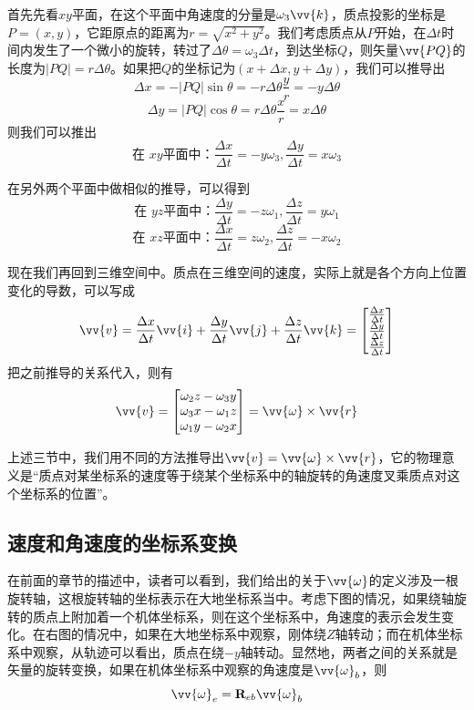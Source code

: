 \documentclass[11pt]{article}
\begin{document}
首先先看$xy$平面，在这个平面中角速度的分量是$\omega_3\vv{k}$，质点投影的坐标是$P=(x,y)$，它距原点的距离为$r = \sqrt{x^2+y^2}$。我们考虑质点从$P$开始，在$\Delta t$时间内发生了一个微小的旋转，转过了$\Delta\theta = \omega_3\Delta t$，到达坐标$Q$，则矢量$\vv{PQ}$的长度为$|PQ| = r\Delta\theta$。如果把$Q$的坐标记为$(x+\Delta x, y + \Delta y)$，我们可以推导出
$$
\Delta x = - |PQ|\sin\theta = - r\Delta\theta \frac{y}{r} = -y \Delta\theta
$$
$$
\Delta y =  |PQ|\cos\theta =  r\Delta\theta \frac{x}{r} = x \Delta\theta
$$
则我们可以推出
$$
\text{在 $xy$平面中：} \frac{\Delta x}{\Delta t} = -y \omega_3 ,  \frac{\Delta y}{\Delta t} = x \omega_3
$$

在另外两个平面中做相似的推导，可以得到
$$
\text{在 $yz$平面中：} \frac{\Delta y}{\Delta t} = -z \omega_1 ,  \frac{\Delta z}{\Delta t} = y \omega_1
$$
$$
\text{在 $xz$平面中：} \frac{\Delta x}{\Delta t} = z \omega_2 ,  \frac{\Delta z}{\Delta t} = -x \omega_2
$$

现在我们再回到三维空间中。质点在三维空间的速度，实际上就是各个方向上位置变化的导数，可以写成
$$
\vv{v} = \frac{\Delta x}{\Delta t} \vv{i} + \frac{\Delta y}{\Delta t} \vv{j} + \frac{\Delta z}{\Delta t} \vv{k} =
\begin{bmatrix}
\frac{\Delta x}{\Delta t} \\
\frac{\Delta y}{\Delta t} \\
\frac{\Delta z}{\Delta t} 
\end{bmatrix}
$$
把之前推导的关系代入，则有
$$
\vv{v} = \begin{bmatrix}
\omega_2z - \omega_3y \\
\omega_3x - \omega_1z \\
\omega_1y - \omega_2x 
\end{bmatrix}
= \vv{\omega} \times \vv{r}
$$

上述三节中，我们用不同的方法推导出$\vv{v} = \vv{\omega} \times \vv{r}$，它的物理意义是“质点对某坐标系的速度等于绕某个坐标系中的轴旋转的角速度叉乘质点对这个坐标系的位置”。


\subsection{速度和角速度的坐标系变换}
在前面的章节的描述中，读者可以看到，我们给出的关于$\vv{\omega}$的定义涉及一根旋转轴，这根旋转轴的坐标表示在大地坐标系当中。考虑下图的情况，如果绕轴旋转的质点上附加着一个机体坐标系，则在这个坐标系中，角速度的表示会发生变化。在右图的情况中，如果在大地坐标系中观察，刚体绕$Z$轴转动；而在机体坐标系中观察，从轨迹可以看出，质点在绕$-y$轴转动。显然地，两者之间的关系就是矢量的旋转变换，如果在机体坐标系中观察的角速度是$\vv{\omega}_b$，则
$$
\vv{\omega}_e = {\bf R}_{eb}\vv{\omega}_b
$$
\end{document}
